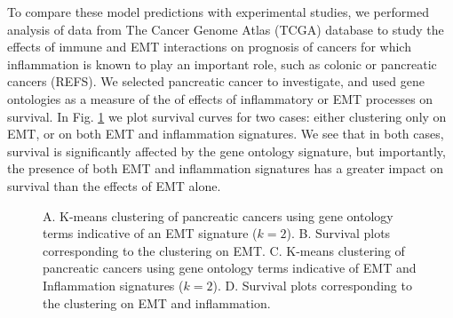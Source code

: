 \documentclass[11pt, a4paper, preprint]{article}
\begin{document}
To compare these model predictions with experimental studies, we performed analysis of data from The Cancer Genome Atlas (TCGA) database to study the effects of immune and EMT interactions on prognosis of cancers for which inflammation is known to play an important role, such as colonic or pancreatic cancers (REFS). We selected pancreatic cancer to investigate, and used gene ontologies as a measure of the of effects of inflammatory or EMT processes on survival. In Fig. \ref{fig:tcga} we plot survival curves for two cases: either clustering only on EMT, or on both EMT and inflammation signatures. We see that in both cases, survival is significantly affected by the gene ontology signature, but importantly, the presence of both EMT and inflammation signatures has a greater impact on survival than the effects of EMT alone.  



\begin{figure}[H]
\center
{}
\caption{A. K-means clustering of pancreatic cancers using gene ontology terms indicative of an EMT signature ($k=2$). B. Survival plots corresponding to the clustering on EMT. C. K-means clustering of pancreatic cancers using gene ontology terms indicative of EMT and Inflammation signatures ($k=2$). D. Survival plots corresponding to the clustering on EMT and inflammation.}
\label{fig:tcga}
\end{figure}



\end{document}
